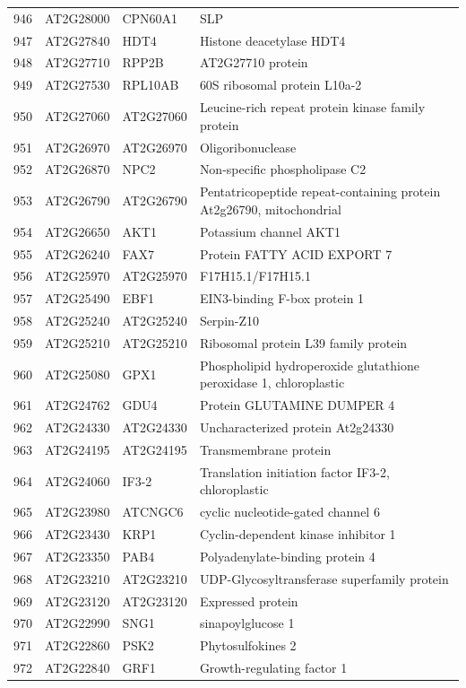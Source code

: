 \documentclass[11pt]{article}
\begin{document}
\begin{center}
\begin{tabular}{rlll}
946 & AT2G28000 & CPN60A1 & SLP\\
947 & AT2G27840 & HDT4 & Histone deacetylase HDT4\\
948 & AT2G27710 & RPP2B & AT2G27710 protein\\
949 & AT2G27530 & RPL10AB & 60S ribosomal protein L10a-2\\
950 & AT2G27060 & AT2G27060 & Leucine-rich repeat protein kinase family protein\\
951 & AT2G26970 & AT2G26970 & Oligoribonuclease\\
952 & AT2G26870 & NPC2 & Non-specific phospholipase C2\\
953 & AT2G26790 & AT2G26790 & Pentatricopeptide repeat-containing protein At2g26790, mitochondrial\\
954 & AT2G26650 & AKT1 & Potassium channel AKT1\\
955 & AT2G26240 & FAX7 & Protein FATTY ACID EXPORT 7\\
956 & AT2G25970 & AT2G25970 & F17H15.1/F17H15.1\\
957 & AT2G25490 & EBF1 & EIN3-binding F-box protein 1\\
958 & AT2G25240 & AT2G25240 & Serpin-Z10\\
959 & AT2G25210 & AT2G25210 & Ribosomal protein L39 family protein\\
960 & AT2G25080 & GPX1 & Phospholipid hydroperoxide glutathione peroxidase 1, chloroplastic\\
961 & AT2G24762 & GDU4 & Protein GLUTAMINE DUMPER 4\\
962 & AT2G24330 & AT2G24330 & Uncharacterized protein At2g24330\\
963 & AT2G24195 & AT2G24195 & Transmembrane protein\\
964 & AT2G24060 & IF3-2 & Translation initiation factor IF3-2, chloroplastic\\
965 & AT2G23980 & ATCNGC6 & cyclic nucleotide-gated channel 6\\
966 & AT2G23430 & KRP1 & Cyclin-dependent kinase inhibitor 1\\
967 & AT2G23350 & PAB4 & Polyadenylate-binding protein 4\\
968 & AT2G23210 & AT2G23210 & UDP-Glycosyltransferase superfamily protein\\
969 & AT2G23120 & AT2G23120 & Expressed protein\\
970 & AT2G22990 & SNG1 & sinapoylglucose 1\\
971 & AT2G22860 & PSK2 & Phytosulfokines 2\\
972 & AT2G22840 & GRF1 & Growth-regulating factor 1\\

\end{tabular}
\end{center}
\end{document}
